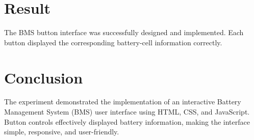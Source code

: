 \documentclass[12pt,a4paper]{report}
\begin{document}

\section{Result}

The BMS button interface was successfully designed and implemented. Each button displayed the corresponding battery-cell information correctly.


\section{Conclusion}

The experiment demonstrated the implementation of an interactive Battery Management System (BMS) user interface using HTML, CSS, and JavaScript. Button controls effectively displayed battery information, making the interface simple, responsive, and user-friendly.

\newpage
\end{document}
